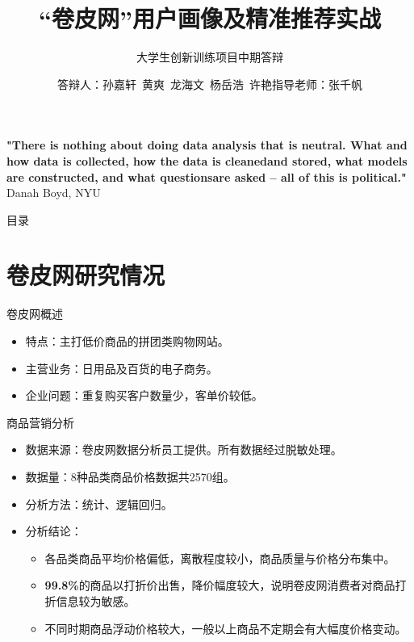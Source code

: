 \documentclass[10pt]{beamer}
\title[中期答辩]{“卷皮网”用户画像及精准推荐实战}
\subtitle{大学生创新训练项目中期答辩}
\author[用户画像与机器学习实战]{答辩人：孙嘉轩\ 黄爽\ 龙海文\ 杨岳浩\ 许艳\newline \newline 指导老师：张千帆}
\institute[]{华中科技大学管理学院}
\begin{document}

\frame{\titlepage}
\begin{frame}
\textbf{"There is nothing about doing data analysis that is neutral.\newline\newline
What and how data is collected, how the data is cleaned\newline\newline and
stored, what models are constructed, and what questions\newline\newline are asked – all of this is political."}
\newline\newline Danah Boyd, NYU

\end{frame}

\begin{frame}{目录}
\tableofcontents
\end{frame}

\section{卷皮网研究情况}

\begin{frame}{卷皮网概述}
\begin{itemize}
\item 特点：主打低价商品的拼团类购物网站。\newline
\item 主营业务：日用品及百货的电子商务。\newline
\item 企业问题：重复购买客户数量少，客单价较低。
\end{itemize}
\end{frame}

\begin{frame}{商品营销分析}
\begin{itemize}
\item 数据来源：卷皮网数据分析员工提供。所有数据经过脱敏处理。\newline
\item 数据量：8种品类商品价格数据共2570组。\newline
\item 分析方法：统计、逻辑回归。\newline
\item 分析结论：\newline
  \begin{itemize}
    \item 各品类商品平均价格偏低，离散程度较小，商品质量与价格分布集中。\newline
    \item \textbf{99.8\%}的商品以打折价出售，降价幅度较大，说明卷皮网消费者对商品打折信息较为敏感。\newline
    \item 不同时期商品浮动价格较大，一般以上商品不定期会有大幅度价格变动。
  \end{itemize}
\end{itemize}
\end{frame}
\end{document}

